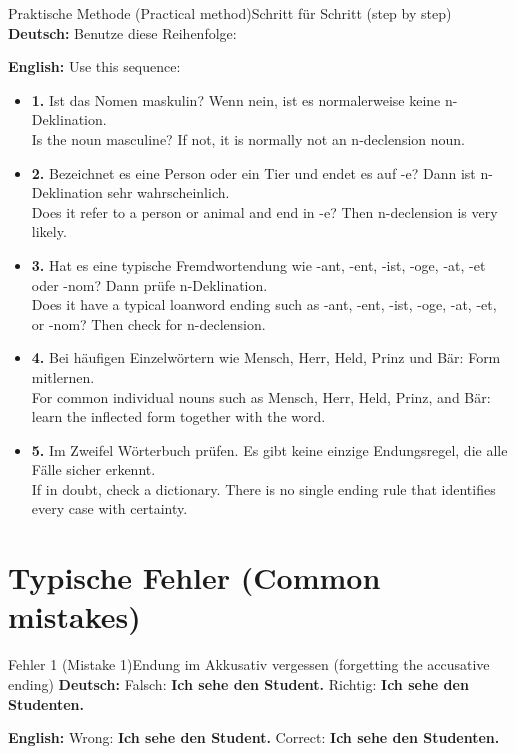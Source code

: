 \documentclass[a4paper,11pt]{article}
\newcommand{\GermanText}[1]{\textbf{Deutsch: }#1\par}
\newcommand{\EnglishText}[1]{{\small\color{SoftGray}\textbf{English: }#1\par}}
\begin{document}
        \begin{grammarentry}{Praktische Methode \textnormal{(Practical method)}}{Schritt für Schritt \textnormal{(step by step)}}
            \GermanText{Benutze diese Reihenfolge:}
            \EnglishText{Use this sequence:}
            \begin{itemize}
                \item \textbf{1.} Ist das Nomen maskulin? Wenn nein, ist es normalerweise keine n-Deklination.\\{\small\color{SoftGray}Is the noun masculine? If not, it is normally not an n-declension noun.}
                \item \textbf{2.} Bezeichnet es eine Person oder ein Tier und endet es auf -e? Dann ist n-Deklination sehr wahrscheinlich.\\{\small\color{SoftGray}Does it refer to a person or animal and end in -e? Then n-declension is very likely.}
                \item \textbf{3.} Hat es eine typische Fremdwortendung wie -ant, -ent, -ist, -oge, -at, -et oder -nom? Dann prüfe n-Deklination.\\{\small\color{SoftGray}Does it have a typical loanword ending such as -ant, -ent, -ist, -oge, -at, -et, or -nom? Then check for n-declension.}
                \item \textbf{4.} Bei häufigen Einzelwörtern wie Mensch, Herr, Held, Prinz und Bär: Form mitlernen.\\{\small\color{SoftGray}For common individual nouns such as Mensch, Herr, Held, Prinz, and Bär: learn the inflected form together with the word.}
                \item \textbf{5.} Im Zweifel Wörterbuch prüfen. Es gibt keine einzige Endungsregel, die alle Fälle sicher erkennt.\\{\small\color{SoftGray}If in doubt, check a dictionary. There is no single ending rule that identifies every case with certainty.}
            \end{itemize}
        \end{grammarentry}

    \section{Typische Fehler \textnormal{(Common mistakes)}}

        \begin{grammarentry}{Fehler 1 \textnormal{(Mistake 1)}}{Endung im Akkusativ vergessen \textnormal{(forgetting the accusative ending)}}
            \GermanText{Falsch: \textbf{Ich sehe den Student.} Richtig: \textbf{Ich sehe den Studenten.}}
            \EnglishText{Wrong: \textbf{Ich sehe den Student.} Correct: \textbf{Ich sehe den Studenten.}}
        \end{grammarentry}
\end{document}
